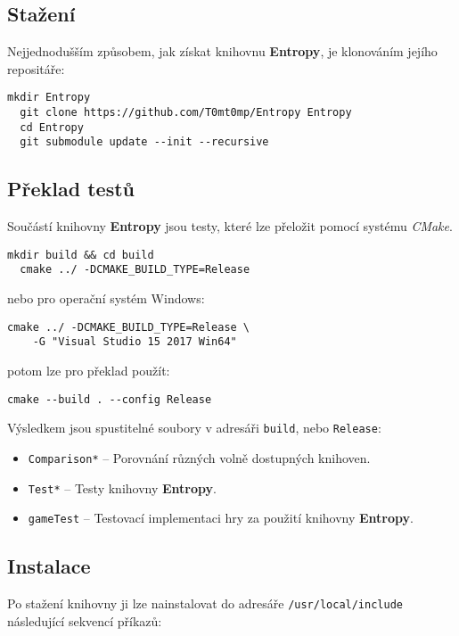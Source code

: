 \subsection*{Stažení}

Nejjednodušším způsobem, jak získat knihovnu \textbf{Entropy}, je klonováním jejího repositáře:

\begin{lstlisting}[basicstyle=\ttfamily]
  mkdir Entropy
  git clone https://github.com/T0mt0mp/Entropy Entropy
  cd Entropy
  git submodule update --init --recursive
\end{lstlisting}

\subsection*{Překlad testů}

Součástí knihovny \textbf{Entropy} jsou testy, které lze přeložit pomocí systému \emph{CMake}. 

\begin{lstlisting}[basicstyle=\ttfamily]
  mkdir build && cd build
  cmake ../ -DCMAKE_BUILD_TYPE=Release
\end{lstlisting}
nebo pro operační systém Windows:
\begin{lstlisting}[basicstyle=\ttfamily]
  cmake ../ -DCMAKE_BUILD_TYPE=Release \
    -G "Visual Studio 15 2017 Win64"
\end{lstlisting}
\pagebreak
potom lze pro překlad použít:
\begin{lstlisting}[basicstyle=\ttfamily]
  cmake --build . --config Release
\end{lstlisting}

\noindent Výsledkem jsou spustitelné soubory v adresáři \texttt{build}, nebo \texttt{Release}:
\begin{itemize}
	\item \texttt{Comparison*} -- Porovnání různých volně dostupných knihoven.
	\item \texttt{Test*} -- Testy knihovny \textbf{Entropy}.
	\item \texttt{gameTest} -- Testovací implementaci hry za použití knihovny \textbf{Entropy}.
\end{itemize}

\subsection*{Instalace}

Po stažení knihovny ji lze nainstalovat do adresáře \texttt{/usr/local/include} následující sekvencí příkazů: 

